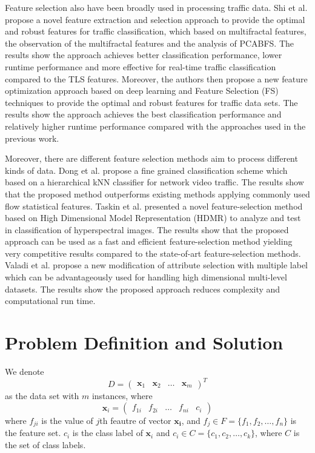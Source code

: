 \documentclass{ieeeaccess}
\theoremstyle{definition}
\begin{document}
Feature selection also have been broadly used in processing traffic data. Shi et al. \cite{Shi2017} propose a novel feature extraction and selection approach to provide the optimal and robust features for traffic classification, which based on multifractal features, the observation of the multifractal features and the analysis of PCABFS. The results show the approach achieves better classification performance, lower runtime performance and more effective for real-time traffic classification compared to the TLS features. Moreover, the authors then propose a new feature optimization approach based on deep learning and Feature Selection (FS) techniques\cite{Shi2018} to provide the optimal and robust features for traffic data sets. The results show the approach achieves the best classification performance and relatively higher runtime performance compared with the approaches used in the previous work.

Moreover, there are different feature selection methods aim to process different kinds of data. Dong et al.\cite{Dong2017} propose a fine grained classification scheme which based on a hierarchical kNN classifier for network video traffic. The results show that the proposed method outperforms existing methods applying commonly used flow statistical features. Taskin et al. \cite{Taskin2017} presented a novel feature-selection method based on High Dimensional Model Representation (HDMR) to analyze and test in classification of hyperspectral images. The results show that the proposed approach can be used as a fast and efficient feature-selection method yielding very competitive results compared to the state-of-art feature-selection methods. Valadi et al.\cite{Valadi2019} propose a new modification of attribute selection with multiple label which can be advantageously used for handling high dimensional multi-level datasets. The results show the proposed approach reduces complexity and computational run time.

\section{Problem Definition and Solution}
\label{sec:problem}

We denote
$$D=\left(\begin{array}{llll}
    \bm{x}_1 & \bm{x}_2 & \ldots & \bm{x}_m
\end{array}\right)^T$$
as the data set with $m$ instances, where
$$\bm{x}_i = \left(\begin{array}{lllll}
    f_{1i} & f_{2i} & \ldots & f_{ni} & c_i
\end{array}\right)$$
where $f_{ji}$ is the value of $j$th feautre of vector $\bm{x_i}$, and $f_j \in F = \{f_1, f_2, \ldots, f_n\}$ is the feature set. $c_i$ is the class label of $\bm{x}_i$ and $c_i \in C = \{c_1, c_2, \ldots, c_k\}$, where $C$ is the set of class labels.
\end{document}
